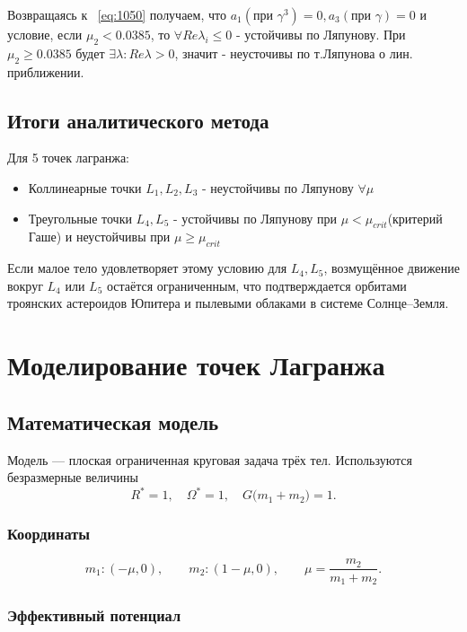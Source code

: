 \documentclass[12pt]{article}
\newcommand{\mutwo}{\mu_2}
\begin{document}
Возвращаясь к ~\eqref{eq:1050} получаем, что $a_1(\text{при }\gamma^3) = 0, a_3(\text{при }\gamma) = 0$ и условие, если $\mutwo < 0.0385$, то $\forall Re\lambda_i \leqslant 0$ - устойчивы по Ляпунову. При $\mutwo \geqslant 0.0385$ будет $\exists\lambda: Re\lambda > 0$, значит - неусточивы по т.Ляпунова о лин. приближении.

\bigskip

\subsection{Итоги аналитического метода}

Для 5 точек лагранжа: 
\begin{itemize}
    \item Коллинеарные точки $L_1,L_2,L_3$ - неустойчивы по Ляпунову $\forall \mu$
    \item Треугольные точки $L_4, L_5$ - устойчивы по Ляпунову при $\mu<\mu_{crit}$(критерий Гаше) и неустойчивы при $\mu \geqslant \mu_{crit}$
\end{itemize}

Если малое тело удовлетворяет этому условию для $L_4,L_5$, возмущённое движение вокруг $L_4$ или $L_5$ остаётся ограниченным, что подтверждается орбитами троянских астероидов Юпитера и пылевыми облаками в системе Солнце–Земля.

\section{Моделирование точек Лагранжа}\label{sec:model}

\subsection{Математическая модель}

Модель --- плоская ограниченная круговая задача трёх тел.
Используются безразмерные величины
\[
R^{*}=1,\quad \Omega^{*}=1,\quad G\bigl(m_1+m_2\bigr)=1 .
\]

\subsubsection{Координаты}

\[
m_1 : (-\mu,0),\qquad
m_2 : (1-\mu,0),\qquad
\mu=\frac{m_2}{m_1+m_2}.
\]

\subsubsection{Эффективный потенциал}
\end{document}
